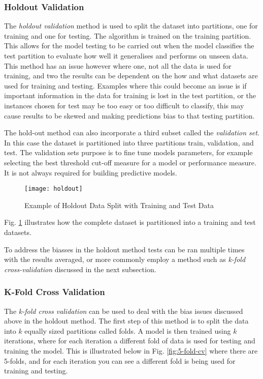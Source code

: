 \subsubsection{Holdout Validation}
The \textit{holdout validation} method is used to split the dataset into partitions, one for training and one for testing. The algorithm is trained on the training partition. This allows for the model testing to be carried out when the model classifies the test partition to evaluate how well it generalises and performs on unseen data. This method has an issue however where one, not all the data is used for training, and two the results can be dependent on the how and what datasets are used for training and testing. Examples where this could become an issue is if important information in the data for training is lost in the test partition, or the instances chosen for test may be too easy or too difficult to classify, this may cause results to be skewed and making  predictions bias to that testing partition. 

The hold-out method can also incorporate a third subset called the \textit{validation set}. In this case the dataset is partitioned into three partitions train, validation, and test. The validation sets purpose is to fine tune models parameters, for example selecting the best threshold cut-off measure for a model or performance measure. It is not always required for building predictive models. 

\begin{figure}[H]
	\texttt{[image: holdout]}
	\caption{Example of Holdout Data Split with Training and Test Data}
	\label{fig:holdout}
\end{figure}

Fig. \ref{fig:holdout} illustrates how the complete dataset is partitioned into a training and test datasets. 

To address the biasses in the holdout method tests can be ran multiple times with the results averaged, or more commonly employ a method such as \textit{k-fold cross-validation} discussed in the next subsection.

\subsubsection{K-Fold Cross Validation}\label{subsec:k_fold}
The \textit{k-fold cross validation} can be used to deal with the bias issues discussed above in the holdout method. The first step of this method is to split the data into $k$ equally sized partitions called folds. A model is then trained using $k$ iterations, where for each iteration a different fold of data is used for testing and training the model. This is illustrated below in Fig. \ref{fig:5-fold-cv} where there are 5-folds, and for each iteration you can see a different fold is being used for training and testing.  

